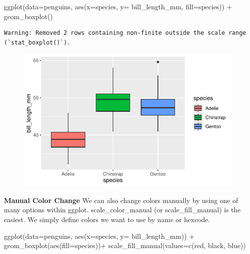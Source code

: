 \documentclass[
  letterpaper,
  DIV=11,
  numbers=noendperiod]{scrartcl}
\newenvironment{Shaded}{\begin{snugshade}}{\end{snugshade}}
\newcommand{\AttributeTok}[1]{\textcolor[rgb]{0.40,0.45,0.13}{#1}}
\newcommand{\FunctionTok}[1]{\textcolor[rgb]{0.28,0.35,0.67}{#1}}
\newcommand{\NormalTok}[1]{\textcolor[rgb]{0.00,0.23,0.31}{#1}}
\newcommand{\SpecialCharTok}[1]{\textcolor[rgb]{0.37,0.37,0.37}{#1}}
\newcommand{\StringTok}[1]{\textcolor[rgb]{0.13,0.47,0.30}{#1}}
\begin{document}
\begin{Shaded}
\begin{Highlighting}[]
\FunctionTok{ggplot}\NormalTok{(}\AttributeTok{data=}\NormalTok{penguins, }\FunctionTok{aes}\NormalTok{(}\AttributeTok{x=}\NormalTok{species, }\AttributeTok{y=}\NormalTok{ bill\_length\_mm, }\AttributeTok{fill=}\NormalTok{species)) }\SpecialCharTok{+}
  \FunctionTok{geom\_boxplot}\NormalTok{()}
\end{Highlighting}
\end{Shaded}

\begin{verbatim}
Warning: Removed 2 rows containing non-finite outside the scale range
(`stat_boxplot()`).
\end{verbatim}

\begin{figure}[H]

{\centering \includegraphics{Lab_2_files/figure-pdf/unnamed-chunk-24-1.pdf}

}

\end{figure}

\textbf{Manual Color Change} We can also change colors manually by using
one of many options within ggplot. scale\_color\_manual (or
scale\_fill\_manual) is the easiest. We simply define colors we want to
use by name or hexcode.

\begin{Shaded}
\begin{Highlighting}[]
\FunctionTok{ggplot}\NormalTok{(}\AttributeTok{data=}\NormalTok{penguins, }\FunctionTok{aes}\NormalTok{(}\AttributeTok{x=}\NormalTok{species, }\AttributeTok{y=}\NormalTok{ bill\_length\_mm)) }\SpecialCharTok{+}
  \FunctionTok{geom\_boxplot}\NormalTok{(}\FunctionTok{aes}\NormalTok{(}\AttributeTok{fill=}\NormalTok{species))}\SpecialCharTok{+}
  \FunctionTok{scale\_fill\_manual}\NormalTok{(}\AttributeTok{values=}\FunctionTok{c}\NormalTok{(}\StringTok{\textquotesingle{}red\textquotesingle{}}\NormalTok{, }\StringTok{\textquotesingle{}black\textquotesingle{}}\NormalTok{, }\StringTok{\textquotesingle{}blue\textquotesingle{}}\NormalTok{))}
\end{Highlighting}
\end{Shaded}
\end{document}

